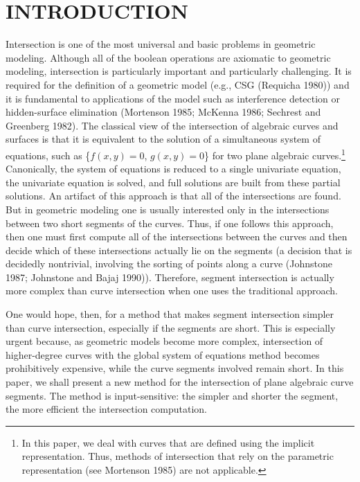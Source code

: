 \section{INTRODUCTION} 
Intersection is one of the most universal and basic problems in geometric modeling.
Although all of the boolean operations are axiomatic to geometric modeling, 
intersection is particularly important and particularly challenging.
It is required for the definition of a geometric model (e.g., CSG (Requicha 1980))  
and it is fundamental to applications of the model such as interference detection or 
hidden-surface elimination (Mortenson 1985; McKenna 1986; Sechrest and Greenberg 1982).
The classical view of the intersection of algebraic curves and surfaces is 
that it is equivalent to the solution of a 
simultaneous system of equations, such as \{$f(x,y)=0$, $g(x,y)=0$\} for two
plane algebraic curves.\footnote{In this paper, we deal with curves that are defined
	using the implicit representation.
	Thus, methods of intersection that rely on
	the parametric representation (see Mortenson 1985) are not applicable.}
Canonically, the system of equations is reduced to a single univariate equation, 
the univariate equation is solved, and full solutions are built from these partial 
solutions.
An artifact of this approach is that all of the intersections are found.
But in geometric modeling one is usually interested only in the intersections
between two short segments of the curves.
Thus, if one follows this approach, then one must first compute 
all of the intersections between the curves
and then decide which of these intersections actually lie on the segments 
(a decision that is decidedly nontrivial, involving the sorting of 
points along a curve (Johnstone 1987; Johnstone and Bajaj 1990)).
Therefore, segment intersection is actually more complex than curve intersection
when one uses the traditional approach.

One would hope, then, for a method that makes segment intersection simpler than curve 
intersection, especially if the segments are short.
This is especially urgent because, as geometric models become more complex,
intersection of higher-degree curves 
with the global system of equations method becomes prohibitively expensive, 
while the curve segments involved remain short.
In this paper, we shall present a new method for the intersection of plane
algebraic curve segments.
The method is input-sensitive: the simpler and shorter the segment, 
the more efficient the intersection computation.

